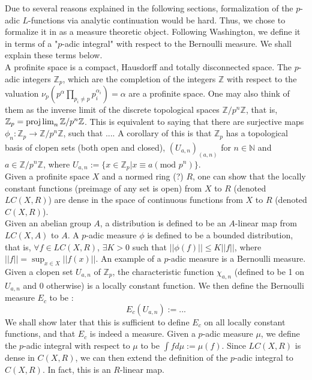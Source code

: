 \documentclass[11pt]{article}
\begin{document}
Due to several reasons explained in the following sections, formalization of the $p$-adic 
$L$-functions via analytic continuation would be hard. Thus, we chose to formalize it in 
as a measure theoretic object. Following Washington, we define it in terms of a 
"$p$-adic integral" with respect to the Bernoulli measure. We shall explain these terms below. \\

A profinite space is a compact, Hausdorff and totally disconnected space. The $p$-adic integers 
$\mathbb{Z}_p$, which are the completion of the integers $\mathbb{Z}$ with respect to the 
valuation $\nu_p(p^{\alpha} \prod_{p_i \ne p} p_i^{\alpha_i}) = \alpha$ are a profinite space. 
One may also think of them as the inverse limit of the discrete topological spaces 
$\mathbb{Z} / p^{n} \mathbb{Z}$, that is, $\mathbb{Z}_p = \projlim_{n} \mathbb{Z} / p^{n} \mathbb{Z}$. 
This is equivalent to saying that there are surjective maps $\phi_n : \mathbb{Z}_p \xrightarrow[]{} \mathbb{Z} / p^{n} \mathbb{Z}$, 
such that .... 
A corollary of this is that $\mathbb{Z}_p$ has a topological basis of clopen sets (both open and closed), 
$(U_{a, n})_{(a, n)}$ for $n \in \mathbb{N}$ and $a \in \mathbb{Z} / p^{n} \mathbb{Z}$, 
where $U_{a, n} := \{ x \in \mathbb{Z}_p | x \equiv a (\text{mod } p^n) \}$. \\

Given a profinite space $X$ and a normed ring (?) $R$, one can show that the locally constant 
functions (preimage of any set is open) from $X$ to $R$ (denoted $LC(X, R)$) are dense in the space of continuous 
functions from $X$ to $R$ (denoted $C(X, R)$). \\

Given an abelian group $A$, a distribution is defined to be an $A$-linear map from $LC(X, A)$ 
to $A$. A $p$-adic measure $\phi$ is defined to be a bounded distribution, that is, $\forall f \in LC(X, R)$, 
$\exists K > 0$ such that $|| \phi (f) || \le K ||f|| $, where $||f|| = \sup_{x \in X} || f(x)||$. 
An example of a $p$-adic measure is a Bernoulli measure. Given a clopen set $U_{a, n}$ of $\mathbb{Z}_p$, 
the characteristic function $\chi_{a, n}$ (defined to be 1 on $U_{a,n}$ and 0 otherwise) is a locally constant function. 
We then define the Bernoulli measure $E_c$ to be :
$$ E_c(U_{a, n}) := ... $$
We shall show later that this is sufficient to define $E_c$ on all locally constant functions, and that 
$E_c$ is indeed a measure. Given a $p$-adic measure $\mu$, we define the $p$-adic integral with respect 
to $\mu$ to be $\int f d\mu := \mu (f)$. Since $LC(X, R)$ is dense in $C(X, R)$, we can then extend the 
definition of the $p$-adic integral to $C(X, R)$. In fact, this is an $R$-linear map. \\
\end{document}
